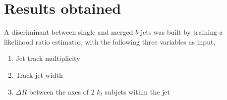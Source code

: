 \section{Results obtained}





A discriminant between single and merged $b$-jets was built by training a likelihood ratio estimator, with the following three variables as input, 
%
\begin{enumerate}\addtolength{\itemsep}{-0.4\baselineskip}
\item
Jet track multiplicity
\item
Track-jet width
\item
$\Delta R$ between the axes of 2 $k_t$ subjets within the jet
\end{enumerate}
%

